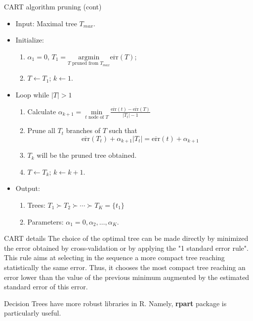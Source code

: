 \documentclass{beamer}
\begin{document}
\begin{frame}{CART algorithm pruning (cont)}
	\begin{itemize}
		\item Input: Maximal tree $T_{max}$.
		\item Initialize:
		\begin{enumerate}
			\item $\alpha_1=0$, $T_1 = \underset{ T \text{ pruned from }T_{max}  }{\textrm{argmin}}
			\overline{\text{err}} (T)$; 
			\item $T \leftarrow T_1$; $k\leftarrow1$. 
		\end{enumerate}
	\item Loop while $|T|>1$
	\begin{enumerate}
		\item Calculate $\alpha_{k+1}= \underset{ t \text{ node of }T  }{\min}
		\frac{\overline{\text{err}} (t)- \overline{\text{err}}(T)}{|T_t| -1}$
		\item Prune all $T_t$ branches of $T$ such that
		\begin{equation*}
			\overline{\text{err}}(T_t)+ \alpha_{k+1}|T_t|= \overline{\text{err}}(t)+ \alpha_{k+1}
		\end{equation*}
	\item $T_k$ will be the pruned tree obtained. 
	\item $T\leftarrow T_k$; $k\leftarrow k+1$.
	\end{enumerate}
	\item Output: 
	\begin{enumerate}
		\item Trees: $T_1 \succ T_2 \succ \cdots \succ T_K=\{t_1\}$
		\item Parameters: $\alpha_1=0, \alpha_2, \ldots, \alpha_K$.
	\end{enumerate}
	\end{itemize}
\end{frame}

\begin{frame}{CART details}
	The choice of the optimal tree can be made directly by minimized the error obtained by cross-validation or by applying the "1 standard error rule".  This rule aims at selecting in the sequence a more compact tree reaching statistically the same error. Thus, it chooses the most compact tree reaching an error lower than the value of the previous minimum augmented by the estimated standard error of this error. 
	
 	Decision Trees have  more robust libraries in R.  Namely, \textbf{rpart} package is particularly useful.
	
\end{frame}
\end{document}
